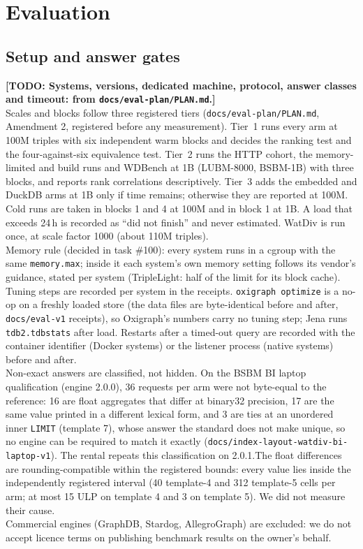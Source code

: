 \documentclass[sigconf, nonacm]{acmart}
\newcommand{\todo}[1]{\textbf{[TODO: #1]}}
\begin{document}
\section{Evaluation}
\subsection{Setup and answer gates}
\todo{Systems, versions, dedicated machine, protocol, answer classes and timeout: from \texttt{docs/eval-plan/PLAN.md}.}\\
Scales and blocks follow three registered tiers (\texttt{docs/eval-plan/PLAN.md}, Amendment 2, registered before any measurement). Tier~1 runs every arm at 100M triples with six independent warm blocks and decides the ranking test and the four-against-six equivalence test. Tier~2 runs the HTTP cohort, the memory-limited and build runs and WDBench at 1B (LUBM-8000, BSBM-1B) with three blocks, and reports rank correlations descriptively. Tier~3 adds the embedded and DuckDB arms at 1B only if time remains; otherwise they are reported at 100M. Cold runs are taken in blocks 1 and 4 at 100M and in block 1 at 1B. A load that exceeds 24\,h is recorded as ``did not finish'' and never estimated. WatDiv is run once, at scale factor 1000 (about 110M triples).\\
Memory rule (decided in task \#100): every system runs in a cgroup with the same \texttt{memory.max}; inside it each system's own memory setting follows its vendor's guidance, stated per system (TripleLight: half of the limit for its block cache).\\
Tuning steps are recorded per system in the receipts. \texttt{oxigraph optimize} is a no-op on a freshly loaded store (the data files are byte-identical before and after, \texttt{docs/eval-v1} receipts), so Oxigraph's numbers carry no tuning step; Jena runs \texttt{tdb2.tdbstats} after load. Restarts after a timed-out query are recorded with the container identifier (Docker systems) or the listener process (native systems) before and after.\\
Non-exact answers are classified, not hidden. On the BSBM BI laptop qualification (engine 2.0.0), 36 requests per arm were not byte-equal to the reference: 16 are float aggregates that differ at binary32 precision, 17 are the same value printed in a different lexical form, and 3 are ties at an unordered inner \texttt{LIMIT} (template 7), whose answer the standard does not make unique, so no engine can be required to match it exactly (\texttt{docs/index-layout-watdiv-bi-laptop-v1}). The rental repeats this classification on 2.0.1.The float differences are rounding-compatible within the registered bounds: every value lies inside the independently registered interval (40 template-4 and 312 template-5 cells per arm; at most 15 ULP on template 4 and 3 on template 5). We did not measure their cause.\\
Commercial engines (GraphDB, Stardog, AllegroGraph) are excluded: we do not accept licence terms on publishing benchmark results on the owner's behalf.
\end{document}
